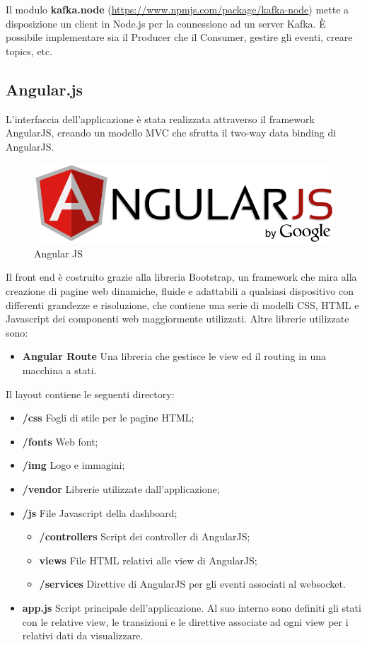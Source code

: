 \documentclass[12pt]{article}
\begin{document}
Il modulo \textbf{kafka.node} (\href{https://www.npmjs.com/package/kafka-node}{https://www.npmjs.com/package/kafka-node}) mette a disposizione un client in Node.js per la connessione ad un server Kafka. \`E possibile implementare sia il Producer che il Consumer, gestire gli eventi, creare topics, etc.

\subsection{Angular.js}

L'interfaccia dell'applicazione è stata realizzata attraverso il framework AngularJS, creando un modello MVC che sfrutta il two-way data binding di AngularJS.

\begin{figure}[H]
	\centering
	\includegraphics[scale=0.50]{images/angular.png}
	\caption{Angular JS}
	\label{angular}
\end{figure}

Il front end è costruito grazie alla libreria Bootstrap, un framework che mira alla creazione di pagine web dinamiche, fluide e adattabili a qualsiasi dispositivo con differenti grandezze e risoluzione, che contiene una serie di modelli CSS, HTML e Javascript dei componenti web maggiormente utilizzati. Altre librerie utilizzate sono: 
\begin{itemize}
	\item \textbf{Angular Route} Una libreria che gestisce le view ed il routing in una macchina a stati.
\end{itemize}

Il layout contiene le seguenti directory: 
\begin{itemize}
	\item \textbf{/css} Fogli di stile per le pagine HTML;
	\item \textbf{/fonts} Web font;
	\item \textbf{/img} Logo e immagini;
	\item \textbf{/vendor} Librerie utilizzate dall'applicazione;
	\item \textbf{/js} File Javascript della dashboard;
	\begin{itemize}
		\item \textbf{/controllers} Script dei controller di AngularJS;
		\item \textbf{views} File HTML relativi alle view di AngularJS;
		\item \textbf{/services} Direttive di AngularJS per gli eventi associati al websocket.
	\end{itemize}
	\item \textbf{app.js} Script principale dell'applicazione. Al suo interno sono definiti gli stati con le relative view, le transizioni e le direttive associate ad ogni view per i relativi dati da visualizzare.
\end{itemize}
\end{document}
